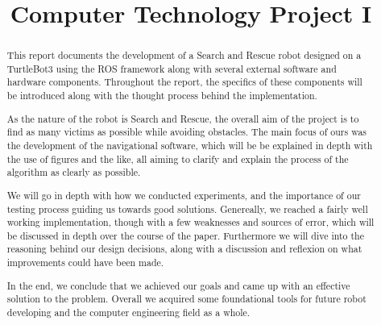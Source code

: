 \documentclass[conference]{IEEEtran}
\begin{document}
\title{Computer Technology Project I\\}

\author{
\and
{}
}

\maketitle

\begin{abstract}
    This report documents the development of a Search and Rescue robot designed on a TurtleBot3 using the ROS framework along with several external software and hardware components.
    Throughout the report, the specifics of these components will be introduced along with the thought process behind the implementation.

    As the nature of the robot is Search and Rescue, the overall aim of the project is to find as many victims as possible while avoiding obstacles.
    The main focus of ours was the development of the navigational software, which will be be explained in depth with the use of figures and the like, all aiming to clarify and explain the process of the algorithm as clearly as possible.
    
    We will go in depth with how we conducted experiments, and the importance of our testing process guiding us towards good solutions.
    Genereally, we reached a fairly well working implementation, though with a few weaknesses and sources of error, which will be discussed in depth over the course of the paper.
    Furthermore we will dive into the reasoning behind our design decisions, along with a discussion and reflexion on what improvements could have been made.

    In the end, we conclude that we achieved our goals and came up with an effective solution to the problem.
    Overall we acquired some foundational tools for future robot developing and the computer engineering field as a whole.
\end{abstract}
\end{document}
